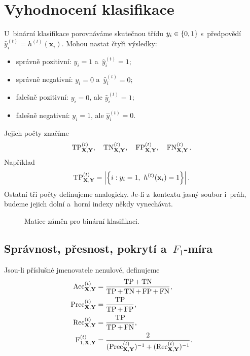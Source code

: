 \section{Vyhodnocení klasifikace}\label{sec:ai-vyhodnoceni-klasifikace}

U~binární klasifikace porovnáváme skutečnou třídu \(y_i\in\left\{0,1\right\}\) s~předpovědí \(\hat y_i^{(t)}=h^{(t)}(\mathbf{x}_i)\). Mohou nastat čtyři výsledky:
\begin{itemize}
    \item správně pozitivní: \(y_i=1\) a~\(\hat y_i^{(t)}=1\);
    \item správně negativní: \(y_i=0\) a~\(\hat y_i^{(t)}=0\);
    \item falešně pozitivní: \(y_i=0\), ale \(\hat y_i^{(t)}=1\);
    \item falešně negativní: \(y_i=1\), ale \(\hat y_i^{(t)}=0\).
\end{itemize}

Jejich počty značíme
\[
    \operatorname{TP}_{\mathbf{X},\mathbf{Y}}^{(t)},
    \quad
    \operatorname{TN}_{\mathbf{X},\mathbf{Y}}^{(t)},
    \quad
    \operatorname{FP}_{\mathbf{X},\mathbf{Y}}^{(t)},
    \quad
    \operatorname{FN}_{\mathbf{X},\mathbf{Y}}^{(t)}.
\]
Například
\[
    \operatorname{TP}_{\mathbf{X},\mathbf{Y}}^{(t)}
    =
    \left| 
        \left\{
            i:y_i=1,\ h^{(t)}(\mathbf{x}_i)=1
        \right\}
     \right|.
\]
Ostatní tři počty definujeme analogicky. Je-li z~kontextu jasný soubor i~práh, budeme jejich dolní a~horní indexy někdy vynechávat.

\begin{figure}[ht]
    \centering
    
    \caption{Matice záměn pro binární klasifikaci.}
    \label{fig:ai-matice-zamen}
\end{figure}

\subsection{Správnost, přesnost, pokrytí a~\(F_1\)-míra}

\begin{definition}\label{def:ai-klasifikacni-metriky}
    Jsou-li příslušné jmenovatele nenulové, definujeme
    \begin{align*}
        \operatorname{Acc}_{\mathbf{X},\mathbf{Y}}^{(t)}
        &=
        \frac{\operatorname{TP}+\operatorname{TN}}{\operatorname{TP}+\operatorname{TN}+\operatorname{FP}+\operatorname{FN}},\\
        \operatorname{Prec}_{\mathbf{X},\mathbf{Y}}^{(t)}
        &=
        \frac{\operatorname{TP}}{\operatorname{TP}+\operatorname{FP}},\\
        \operatorname{Rec}_{\mathbf{X},\mathbf{Y}}^{(t)}
        &=
        \frac{\operatorname{TP}}{\operatorname{TP}+\operatorname{FN}},\\
        \operatorname{F}_{1,\mathbf{X},\mathbf{Y}}^{(t)}
        &=
        \frac{2}{
            (\operatorname{Prec}_{\mathbf{X},\mathbf{Y}}^{(t)})^{-1}
            +
            (\operatorname{Rec}_{\mathbf{X},\mathbf{Y}}^{(t)})^{-1}
        }.
    \end{align*}
\end{definition}

